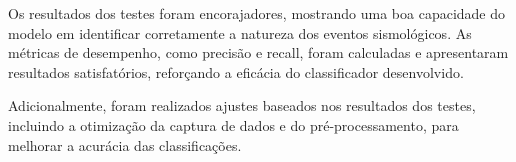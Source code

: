 \par{Os resultados dos testes foram encorajadores, mostrando uma boa capacidade do modelo em identificar corretamente a natureza dos eventos sismológicos. As métricas de desempenho, como precisão e recall, foram calculadas e apresentaram resultados satisfatórios, reforçando a eficácia do classificador desenvolvido.}

\par{Adicionalmente, foram realizados ajustes baseados nos resultados dos testes, incluindo a otimização da captura de dados e do pré-processamento, para melhorar a acurácia das classificações.}


